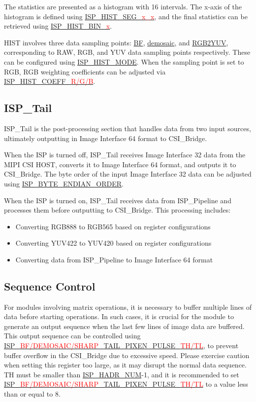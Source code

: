 \documentclass[main\_\_EN.tex]{subfiles}
\begin{document}
The statistics are presented as a histogram with 16 intervals. The x-axis of the histogram is defined using \hyperref[fielddesc:ISPHISTSEG01]{ISP\_HIST\_SEG\_\textcolor{red}{x\_x}}, and the final statistics can be retrieved using \hyperref[fielddesc:ISPHISTBIN0]{ISP\_HIST\_BIN\_\textcolor{red}{x}}.

HIST involves three data sampling points: \hyperref[sec:isp_bf]{BF}, \hyperref[sec:isp_demosaic]{demosaic}, and \hyperref[sec:isp_rgb2yuv]{RGB2YUV}, corresponding to RAW, RGB, and YUV data sampling points respectively. These can be configured using \hyperref[fielddesc:ISPHISTMODE]{ISP\_HIST\_MODE}. When the sampling point is set to RGB, RGB weighting coefficients can be adjusted via \hyperref[fielddesc:ISPHISTCOEFFR]{ISP\_HIST\_COEFF\_\textcolor{red}{R/G/B}}.


\subsection{ISP\_Tail}
ISP\_Tail is the post-processing section that handles data from two input sources, ultimately outputting in Image Interface 64 format to CSI\_Bridge.

When the ISP is turned off, ISP\_Tail receives Image Interface 32 data from the MIPI CSI HOST, converts it to Image Interface 64 format, and outputs it to CSI\_Bridge. The byte order of the input Image Interface 32 data can be adjusted using \hyperref[fielddesc:ISPBYTEENDIANORDER]{ISP\_BYTE\_ENDIAN\_ORDER}.

When the ISP is turned on, ISP\_Tail receives data from ISP\_Pipeline and processes them before outputting to CSI\_Bridge. This processing includes:
\begin{itemize}
    \item Converting RGB888 to RGB565 based on register configurations
    \item Converting YUV422 to YUV420 based on register configurations
    \item Converting data from ISP\_Pipeline to Image Interface 64 format
\end{itemize}


\subsection{Sequence Control}

For modules involving matrix operations, it is necessary to buffer multiple lines of data before starting operations. In such cases, it is crucial for the module to generate an output sequence when the last few lines of image data are buffered. This output sequence can be controlled using \hyperref[fielddesc:ISPBFTAILPIXENPULSETH]{ISP\_\textcolor{red}{BF/DEMOSAIC/SHARP}\_TAIL\_PIXEN\_PULSE\_\textcolor{red}{TH/TL}}, to prevent buffer overflow in the CSI\_Bridge due to excessive speed. Please exercise caution when setting this register too large, as it may disrupt the normal data sequence. TH must be smaller than \hyperref[fielddesc:ISPHADRNUM]{ISP\_HADR\_NUM}-1, and it is recommended to set \hyperref[fielddesc:ISPBFTAILPIXENPULSETH]{ISP\_\textcolor{red}{BF/DEMOSAIC/SHARP}\_TAIL\_PIXEN\_PULSE\_\textcolor{red}{TH/TL}} to a value less than or equal to 8.
\end{document}

